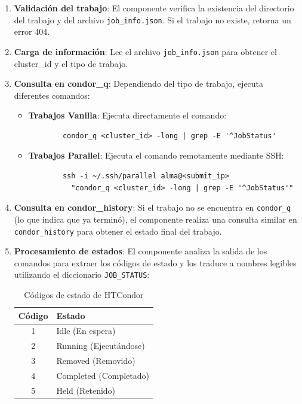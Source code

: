 \begin{enumerate}
	\item \textbf{Validación del trabajo}: El componente verifica la existencia del directorio del trabajo y del archivo \texttt{job\_info.json}. Si el trabajo no existe, retorna un error 404.

	\item \textbf{Carga de información}: Lee el archivo \texttt{job\_info.json} para obtener el cluster\_id y el tipo de trabajo.

	\item \textbf{Consulta en condor\_q}: Dependiendo del tipo de trabajo, ejecuta diferentes comandos:

	      \begin{itemize}
		      \item \textbf{Trabajos Vanilla}: Ejecuta directamente el comando:
		            \begin{verbatim}
		condor_q <cluster_id> -long | grep -E '^JobStatus'
		\end{verbatim}

		      \item \textbf{Trabajos Parallel}: Ejecuta el comando remotamente mediante SSH:
		            \begin{verbatim}
		ssh -i ~/.ssh/parallel alma@<submit_ip>
		  "condor_q <cluster_id> -long | grep -E '^JobStatus'"
		\end{verbatim}
	      \end{itemize}

	\item \textbf{Consulta en condor\_history}: Si el trabajo no se encuentra en \texttt{condor\_q} (lo que indica que ya terminó), el componente realiza una consulta similar en \texttt{condor\_history} para obtener el estado final del trabajo.

	\item \textbf{Procesamiento de estados}: El componente analiza la salida de los comandos para extraer los códigos de estado y los traduce a nombres legibles utilizando el diccionario \texttt{JOB\_STATUS}:

	      \begin{table}[H]
		      \centering
		      \begin{tabular}{|c|l|}
			      \hline
			      \textbf{Código} & \textbf{Estado}        \\
			      \hline
			      1               & Idle (En espera)       \\
			      2               & Running (Ejecutándose) \\
			      3               & Removed (Removido)     \\
			      4               & Completed (Completado) \\
			      5               & Held (Retenido)        \\
			      \hline
		      \end{tabular}
		      \caption{Códigos de estado de HTCondor}
		      \label{tab:job-status-codes}
	      \end{table}


\end{enumerate}
